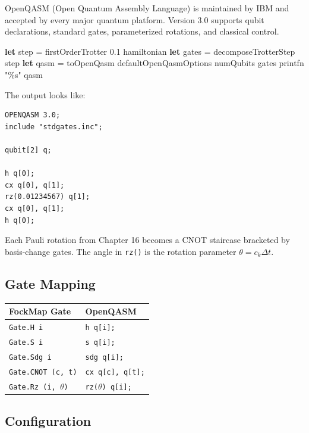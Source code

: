 \documentclass[
  11pt,
  oneside]{book}
\newenvironment{Shaded}{\begin{snugshade}}{\end{snugshade}}
\newcommand{\FloatTok}[1]{\textcolor[rgb]{0.00,0.00,0.81}{#1}}
\newcommand{\KeywordTok}[1]{\textcolor[rgb]{0.13,0.29,0.53}{\textbf{#1}}}
\newcommand{\NormalTok}[1]{#1}
\newcommand{\StringTok}[1]{\textcolor[rgb]{0.31,0.60,0.02}{#1}}
\begin{document}
OpenQASM (Open Quantum Assembly Language) is maintained by IBM and
accepted by every major quantum platform. Version 3.0 supports qubit
declarations, standard gates, parameterized rotations, and classical
control.

\begin{Shaded}
\begin{Highlighting}[]
\KeywordTok{let}\NormalTok{ step = firstOrderTrotter }\FloatTok{0.1}\NormalTok{ hamiltonian}
\KeywordTok{let}\NormalTok{ gates = decomposeTrotterStep step}
\KeywordTok{let}\NormalTok{ qasm = toOpenQasm defaultOpenQasmOptions numQubits gates}
\NormalTok{printfn }\StringTok{"\%s"}\NormalTok{ qasm}
\end{Highlighting}
\end{Shaded}

The output looks like:

\begin{verbatim}
OPENQASM 3.0;
include "stdgates.inc";

qubit[2] q;

h q[0];
cx q[0], q[1];
rz(0.01234567) q[1];
cx q[0], q[1];
h q[0];
\end{verbatim}

Each Pauli rotation from Chapter 16 becomes a CNOT staircase bracketed
by basis-change gates. The angle in \texttt{rz()} is the rotation
parameter \(\theta = c_k \Delta t\).

\subsection{Gate Mapping}\label{gate-mapping}

\begin{longtable}[]{@{}ll@{}}
\toprule\noalign{}
FockMap Gate & OpenQASM \\
\midrule\noalign{}
\endhead
\bottomrule\noalign{}
\endlastfoot
\texttt{Gate.H\ i} & \texttt{h\ q{[}i{]};} \\
\texttt{Gate.S\ i} & \texttt{s\ q{[}i{]};} \\
\texttt{Gate.Sdg\ i} & \texttt{sdg\ q{[}i{]};} \\
\texttt{Gate.CNOT\ (c,\ t)} & \texttt{cx\ q{[}c{]},\ q{[}t{]};} \\
\texttt{Gate.Rz\ (i,\ $\theta$)} & \texttt{rz($\theta$)\ q{[}i{]};} \\
\end{longtable}

\subsection{Configuration}\label{configuration}
\end{document}
